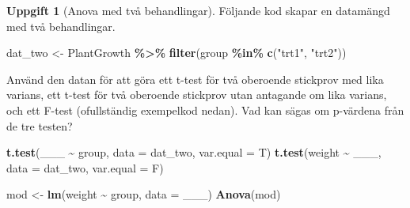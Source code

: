 \documentclass[
]{book}
\newenvironment{Shaded}{\begin{snugshade}}{\end{snugshade}}
\newcommand{\AttributeTok}[1]{\textcolor[rgb]{0.13,0.29,0.53}{#1}}
\newcommand{\FunctionTok}[1]{\textcolor[rgb]{0.13,0.29,0.53}{\textbf{#1}}}
\newcommand{\NormalTok}[1]{#1}
\newcommand{\OtherTok}[1]{\textcolor[rgb]{0.56,0.35,0.01}{#1}}
\newcommand{\SpecialCharTok}[1]{\textcolor[rgb]{0.81,0.36,0.00}{\textbf{#1}}}
\newcommand{\StringTok}[1]{\textcolor[rgb]{0.31,0.60,0.02}{#1}}
\theoremstyle{definition}
\theoremstyle{definition}
\theoremstyle{definition}
\newtheorem{exercise}{Uppgift}[chapter]
\theoremstyle{definition}
\theoremstyle{remark}
\begin{document}
\begin{exercise}[Anova med två behandlingar]

Följande kod skapar en datamängd med två behandlingar.

\begin{Shaded}
\begin{Highlighting}[]
\NormalTok{dat\_two }\OtherTok{\textless{}{-}}\NormalTok{ PlantGrowth }\SpecialCharTok{\%\textgreater{}\%} \FunctionTok{filter}\NormalTok{(group }\SpecialCharTok{\%in\%} \FunctionTok{c}\NormalTok{(}\StringTok{"trt1"}\NormalTok{, }\StringTok{"trt2"}\NormalTok{))}
\end{Highlighting}
\end{Shaded}

Använd den datan för att göra ett t-test för två oberoende stickprov med lika varians, ett t-test för två oberoende stickprov utan antagande om lika varians, och ett F-test (ofullständig exempelkod nedan). Vad kan sägas om p-värdena från de tre testen?

\begin{Shaded}
\begin{Highlighting}[]
\FunctionTok{t.test}\NormalTok{(\_\_\_ }\SpecialCharTok{\textasciitilde{}}\NormalTok{ group, }\AttributeTok{data =}\NormalTok{ dat\_two, }\AttributeTok{var.equal =}\NormalTok{ T)}
\FunctionTok{t.test}\NormalTok{(weight }\SpecialCharTok{\textasciitilde{}}\NormalTok{ \_\_\_, }\AttributeTok{data =}\NormalTok{ dat\_two, }\AttributeTok{var.equal =}\NormalTok{ F)}

\NormalTok{mod }\OtherTok{\textless{}{-}} \FunctionTok{lm}\NormalTok{(weight }\SpecialCharTok{\textasciitilde{}}\NormalTok{ group, }\AttributeTok{data =}\NormalTok{ \_\_\_)}
\FunctionTok{Anova}\NormalTok{(mod)}
\end{Highlighting}
\end{Shaded}

\end{exercise}
\end{document}
